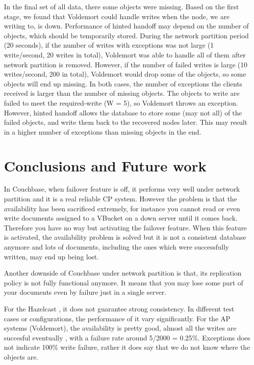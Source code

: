 \documentclass[a4paper]{article}
\begin{document}
In the final set of all data, there some objects were missing. 
Based on the first stage, we found that Voldemort could handle writes when the node, we are writing to, is down. 
Performance of hinted handoff may depend on the number of objects, which should be temporarily stored. 
During the network partition period (20 seconds), if the number of writes with exceptions was not large (1 write/second, 20 writes in total), Voldemort was able to handle all of them after network partition is removed. 
However, if the number of failed writes is large (10 writes/second, 200 in total), Voldemort would drop some of the objects, so some objects will end up missing. 
In both cases, the number of exceptions the clients received is larger than the number of missing objects. 
The objects to write are failed to meet the required-write (W = 5), so Voldemort throws an exception. 
However, hinted handoff allows the database to store some (may not all) of the failed objects, and write them back to the recovered nodes later. 
This may result in a higher number of exceptions than missing objects in the end.

\section{Conclusions and Future work}

In Couchbase, when failover feature is off, it performs very well under network partition and it is a real reliable CP system.
However the problem is that the availability has been sacrificed extremely, for instance you cannot read or even write documents assigned to a VBucket on a down server until it comes back.
Therefore you have no way but activating the failover feature. 
When this feature is activated, the availability problem is solved but it is not a consistent database anymore and lots of documents, including the ones which were successfully written, may end up being lost. 

Another downside of Couchbase under network partition is that, its replication policy is not fully functional anymore.
It means that you may lose some part of your documents even by failure just in a single server.

For the Hazelcast , it does not guarantee strong consistency. In different test cases or configurations, the performance of it
vary significantly.
For the AP systems (Voldemort), the availability is pretty good, almost all the writes are succesful eventually \cite{werner}, with a failure rate around 5/2000 = 0.25\%.
Exceptions does not indicate 100\% write failure, rather it does say that we do not know where the objects are.
\end{document}

